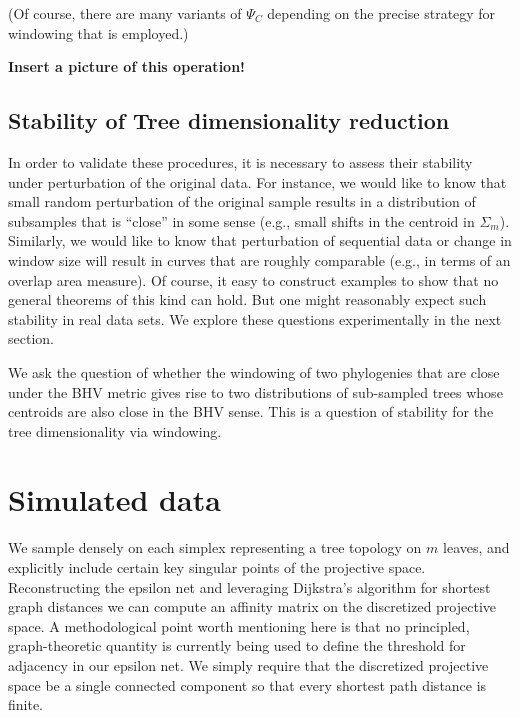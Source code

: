 \documentclass[a4paper,11pt]{article}
\begin{document}
(Of course, there are many variants of $\Psi_C$ depending on the precise strategy for windowing that is employed.)

{\bf Insert a picture of this operation!}

\subsection{Stability of Tree dimensionality reduction}

In order to validate these procedures, it is necessary to assess their stability under perturbation of the original data.
For instance, we would like to know that small random perturbation of the original sample results in a distribution of subsamples that is ``close'' in some sense (e.g., small shifts in the centroid in $\Sigma_m$).
Similarly, we would like to know that perturbation of sequential data or change in window size will result in curves that are roughly comparable (e.g., in terms of an overlap area measure).
Of course, it easy to construct examples to show that no general theorems of this kind can hold.
But one might reasonably expect such stability in real data sets.
We explore these questions experimentally in the next section.

We ask the question of whether the windowing of two phylogenies that are close under the BHV metric gives rise to two distributions of sub-sampled trees whose centroids are also close in the BHV sense.
This is a question of stability for the tree dimensionality via windowing.



\section{Simulated data}\label{sec:simulated}

We sample densely on each simplex representing a tree topology on $m$ leaves, and explicitly include certain key singular points of the projective space.
Reconstructing the epsilon net and leveraging Dijkstra's algorithm for shortest graph distances we can compute an affinity matrix on the discretized projective space.
A methodological point worth mentioning here is that no principled, graph-theoretic quantity is currently being used to define the threshold for adjacency in our epsilon net.
We simply require that the discretized projective space be a single connected component so that every shortest path distance is finite.
\end{document}
